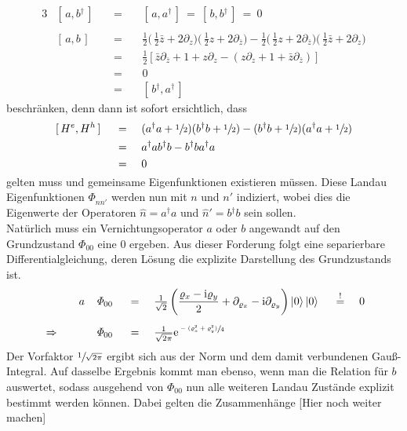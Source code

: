 \documentclass[a4paper,11pt, twoside]{article}
\newcommand{\ind}[2]{{_{#1}^{#2}}}
\newcommand{\+}{\dagger}
\newcommand{\ck}{\left |}
\newcommand{\ket}{\right \rangle}
\newcommand{\com}[2]{[\, #1, #2 \,]}
\renewcommand{\exp}[1]{\tt{e}^{#1}}
\renewcommand{\it}{\mathit}
\renewcommand{\^}{\hat}
\renewcommand{\tt}{\text}
\renewcommand{\~}{\widetilde}
\begin{document}
\begin{alignat*}{3}
& \com{a}{b\ind{}{\+}} && \ = \ &&\com{a}{a\ind{}{\+}}\ =\ \com{b}{b\ind{}{\+}}\ =\ 0 \\ \\
& \com{a}{b} &&\ =\ && \frac{1}{2}\Big(\,\frac{1}{2}\bar z + 2\partial_{z}\Big)\Big(\,\frac{1}{2}z + 2\partial_{\bar z}\Big) -\frac{1}{2}\Big(\,\frac{1}{2}z + 2\partial_{\bar z}\Big)\Big(\,\frac{1}{2}\bar z + 2\partial_{ z}\Big)\\[3pt]
& &&\ =\ && \frac{1}{2}[\bar z \partial_{\bar z}+1 +z\partial_z - (z \partial_{ z}+1 +\bar z\partial_{\bar z})] \\[3pt]
& &&\ =\ && 0 \\
& &&\ =\ && \com{b\ind{}{\+}}{a\ind{}{\+}}
\end{alignat*}
beschränken, denn dann ist sofort ersichtlich, dass 
\begin{alignat*}{3}
& \com{H\ind{}{e}}{H\ind{}{h}} &&\ =\ && (a\ind{}{\+}a+\sfrac{1}{2})(b\ind{}{\+}b+\sfrac{1}{2})-(b\ind{}{\+}b+\sfrac{1}{2})(a\ind{}{\+}a+\sfrac{1}{2}) \\
& &&\ = \ && a\ind{}{\+}ab\ind{}{\+}b - b\ind{}{\+}ba\ind{}{\+}a \\
& &&\ = \ && 0
\end{alignat*}
gelten muss und gemeinsame Eigenfunktionen existieren müssen. Diese Landau Eigenfunktionen $\it{\Phi}\ind{nn'}{}$ werden nun mit $n$ und $n'$ indiziert, wobei dies die Eigenwerte der Operatoren $\^ n = a\ind{}{\+}a$ und $\^n '= b\ind{}{\+}b $ sein sollen. \\
Natürlich muss ein Vernichtungsoperator $a$ oder $b$ angewandt auf den Grundzustand $\it{\Phi}_{00}$ eine $0$ ergeben. Aus dieser Forderung folgt eine separierbare Differentialgleichung, deren Lösung die explizite Darstellung des Grundzustands ist. 
\begin{alignat*}{7}
& && a&&\it{\Phi}_{00} &&\ =\ && \tfrac{1}{\sqrt{2}}\left (\frac{\varrho_x -\tt i\varrho_y}{2}+\partial_{\varrho_x}-\tt i \partial_{\varrho_y}\right )\ck 0\ket \ck 0\ket &&\ \stackrel{!}{=} \ &&0 \\[5pt]
& \Rightarrow  \quad  && &&\it{\Phi}_{00} &&\ = \ && \tfrac{1}{\sqrt{2\pi}}\exp{\sfrac{-(\varrho_x ^2 + \varrho_y ^2)}{4}}
\end{alignat*}
Der Vorfaktor $\sfrac{1}{\sqrt{2\pi}}$ ergibt sich aus der Norm und dem damit verbundenen Gauß-Integral. Auf dasselbe Ergebnis kommt man ebenso, wenn man die Relation für $b$ auswertet, sodass ausgehend von $\it{\Phi}_{00}$ nun alle weiteren Landau Zustände explizit bestimmt werden können. Dabei gelten die Zusammenhänge [Hier noch weiter machen]
\newpage
\end{document}
